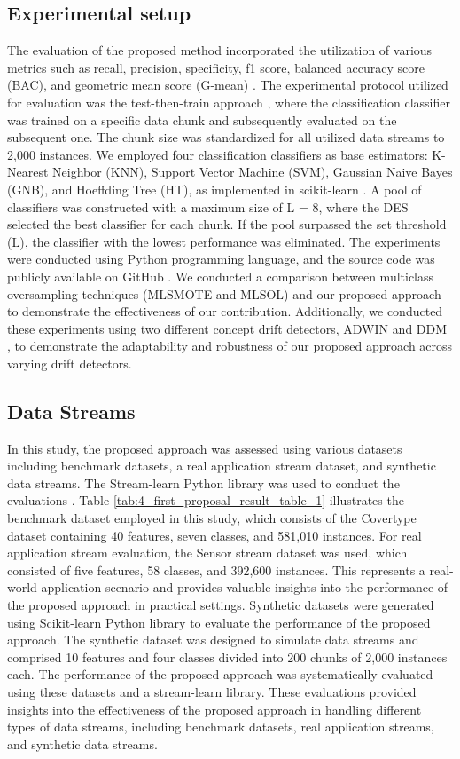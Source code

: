\subsection{Experimental setup}
The evaluation of the proposed method incorporated the utilization of various metrics such as recall, precision, specificity, f1 score, balanced accuracy score (BAC), and geometric mean score (G-mean) \cite{bu2016pdf}. The experimental protocol utilized for evaluation was the test-then-train approach \cite{venkatasubramanianinformation}, where the classification classifier was trained on a specific data chunk and subsequently evaluated on the subsequent one. The chunk size was standardized for all utilized data streams to 2,000 instances. We employed four classification classifiers as base estimators: K-Nearest Neighbor (KNN), Support Vector Machine (SVM), Gaussian Naive Bayes (GNB), and Hoeffding Tree (HT), as implemented in scikit-learn \cite{frias2014online}. A pool of classifiers was constructed with a maximum size of L = 8, where the DES selected the best classifier for each chunk. If the pool surpassed the set threshold (L), the classifier with the lowest performance was eliminated. The experiments were conducted using Python programming language, and the source code was publicly available on GitHub . We conducted a comparison between multiclass oversampling techniques (MLSMOTE and MLSOL) and our proposed approach to demonstrate the effectiveness of our contribution. Additionally, we conducted these experiments using two different concept drift detectors, ADWIN \cite{storkey2008training} and DDM \cite{losing2016knn}, to demonstrate the adaptability and robustness of our proposed approach across varying drift detectors.

\subsection{Data Streams}
In this study, the proposed approach was assessed using various datasets including benchmark datasets, a real application stream dataset, and synthetic data streams. The Stream-learn Python library was used to conduct the evaluations \cite{dries2009adaptive}. Table \ref{tab:4_first_proposal_result_table_1} illustrates the benchmark dataset employed in this study, which consists of the Covertype dataset containing 40 features, seven classes, and 581,010 instances. For real application stream evaluation, the Sensor stream dataset was used, which consisted of five features, 58 classes, and 392,600 instances. This represents a real-world application scenario and provides valuable insights into the performance of the proposed approach in practical settings. Synthetic datasets were generated using Scikit-learn Python library to evaluate the performance of the proposed approach. The synthetic dataset was designed to simulate data streams and comprised 10 features and four classes divided into 200 chunks of 2,000 instances each. The performance of the proposed approach was systematically evaluated using these datasets and a stream-learn library. These evaluations provided insights into the effectiveness of the proposed approach in handling different types of data streams, including benchmark datasets, real application streams, and synthetic data streams.

